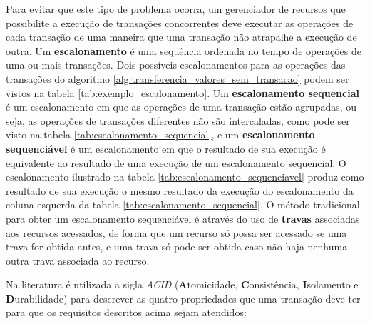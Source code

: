 \documentclass[11pt,twoside,a4paper]{book}
\begin{document}
Para evitar que este tipo de problema ocorra, um gerenciador de recursos que possibilite a execução de transações concorrentes deve executar as operações de cada transação de uma maneira que uma transação não atrapalhe a execução de outra. Um \textbf{escalonamento} é uma sequência ordenada no tempo de operações de uma ou mais transações. Dois possíveis escalonamentos para as operações das transações do algoritmo \ref{alg:transferencia_valores_sem_transacao} podem ser vistos na tabela \ref{tab:exemplo_escalonamento}. Um \textbf{escalonamento sequencial} é um escalonamento em que as operações de uma transação estão agrupadas, ou seja, as operações de transações diferentes não são intercaladas, como pode ser visto na tabela \ref{tab:escalonamento_sequencial}, e um \textbf{escalonamento sequenciável} é um escalonamento em que o resultado de sua execução é equivalente ao resultado de uma execução de um escalonamento sequencial. O escalonamento ilustrado na tabela \ref{tab:escalonamento_sequenciavel} produz como resultado de sua execução o mesmo resultado da execução do escalonamento da coluna esquerda da tabela \ref{tab:escalonamento_sequencial}. O método tradicional para obter um escalonamento sequenciável é através do uso de \textbf{travas} associadas aos recursos acessados, de forma que um recurso só possa ser acessado se uma trava for obtida antes, e uma trava só pode ser obtida caso não haja nenhuma outra trava associada ao recurso.

Na literatura é utilizada a sigla \emph{ACID} (\textbf{A}tomicidade, \textbf{C}onsistência, \textbf{I}solamento e \textbf{D}urabilidade) para descrever as quatro propriedades que uma transação deve ter para que os requisitos descritos acima sejam atendidos:
\end{document}
